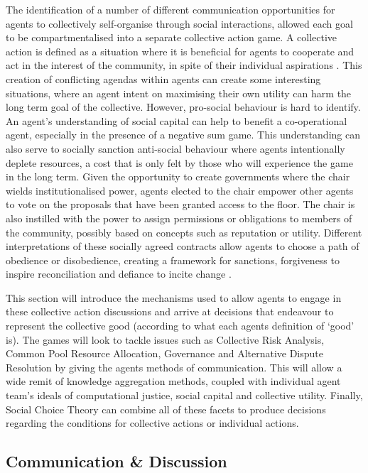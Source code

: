 The identification of a number of different communication opportunities for agents to collectively self-organise through social interactions, allowed each goal to be compartmentalised into a separate collective action game. A collective action is defined as a situation where it is beneficial for agents to cooperate and act in the interest of the community, in spite of their individual aspirations \cite{ober2008}. This creation of conflicting agendas within agents can create some interesting situations, where an agent intent on maximising their own utility can harm the long term goal of the collective. However, pro-social behaviour is hard to identify. An agent's understanding of social capital can help to benefit a co-operational agent, especially in the presence of a negative sum game. This understanding can also serve to socially sanction anti-social behaviour where agents intentionally deplete resources, a cost that is only felt by those who will experience the game in the long term. Given the opportunity to create governments where the chair wields institutionalised power, agents elected to the chair empower other agents to vote on the proposals that have been granted access to the floor. The chair is also instilled with the power to assign permissions or obligations to members of the community, possibly based on concepts such as reputation or utility. Different interpretations of these socially agreed contracts allow agents to choose a path of obedience or disobedience, creating a framework for sanctions, forgiveness to inspire reconciliation and defiance to incite change \cite{pitt}.

This section will introduce the mechanisms used to allow agents to engage in these collective action discussions and arrive at decisions that endeavour to represent the collective good (according to what each agents definition of `good' is). The games will look to tackle issues such as Collective Risk Analysis, Common Pool Resource Allocation, Governance and Alternative Dispute Resolution by giving the agents methods of communication. This will allow a wide remit of knowledge aggregation methods, coupled with individual agent team's ideals of computational justice, social capital and collective utility. Finally, Social Choice Theory can combine all of these facets to produce decisions regarding the conditions for collective actions or individual actions. 

\subsection{Communication \& Discussion}\label{sec: comms}

